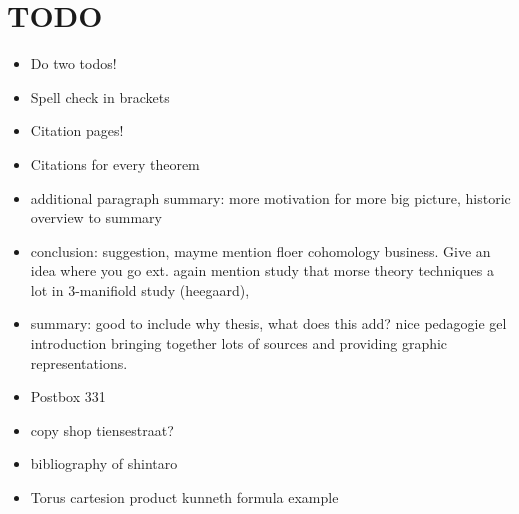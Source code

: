 \chapter*{TODO}
\begin{itemize}
    \item Do two todos!
    \item Spell check in brackets
    \item Citation pages!
    \item Citations for every theorem
    \item additional paragraph summary: more motivation for more big picture, historic overview  to summary
    \item conclusion: suggestion, mayme mention floer cohomology business. Give an idea where you go ext.  again mention study that morse theory techniques a lot in 3-manifiold study (heegaard), 
    \item summary: good to include  why thesis, what does this add? nice pedagogie gel introduction bringing together lots of sources and providing graphic representations.
    \item Postbox 331
    \item copy shop tiensestraat?
        \item bibliography of shintaro
        \item Torus cartesion product kunneth formula example
\end{itemize}
